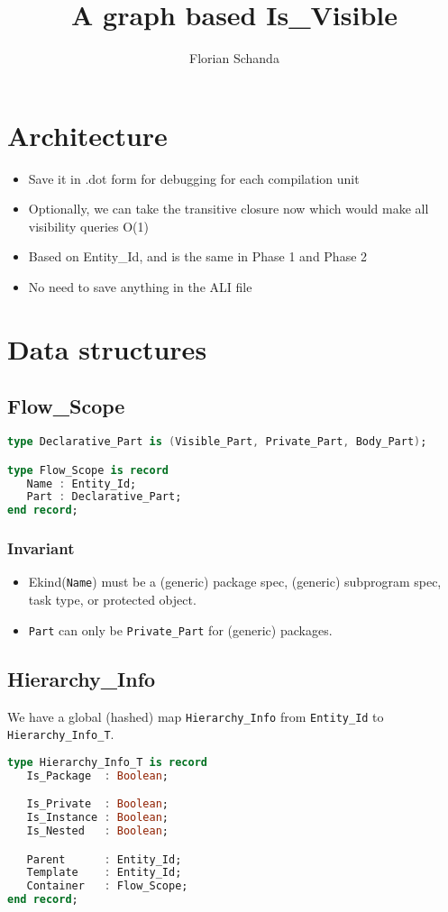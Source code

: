 \documentclass{article}
\title{A graph based Is\_Visible}
\author{Florian Schanda}
\begin{document}
\section{Architecture}
\begin{itemize}
\item Save it in .dot form for debugging for each compilation unit
\item Optionally, we can take the transitive closure now which would make
  all visibility queries O(1)
\item Based on Entity\_Id, and is the same in Phase 1 and Phase 2
\item No need to save anything in the ALI file
\end{itemize}

\section{Data structures}

\subsection{Flow\_Scope}
\begin{lstlisting}[language=Ada]
type Declarative_Part is (Visible_Part, Private_Part, Body_Part);

type Flow_Scope is record
   Name : Entity_Id;
   Part : Declarative_Part;
end record;
\end{lstlisting}

\subsubsection{Invariant}
\begin{itemize}
\item Ekind(\verb|Name|) must be a (generic) package spec, (generic)
  subprogram spec, task type, or protected object.
\item \verb|Part| can only be \verb|Private_Part| for (generic) packages.
\end{itemize}

\subsection{Hierarchy\_Info}
We have a global (hashed) map \verb|Hierarchy_Info| from \verb|Entity_Id|
to \verb|Hierarchy_Info_T|.

\begin{lstlisting}[language=Ada]
type Hierarchy_Info_T is record
   Is_Package  : Boolean;

   Is_Private  : Boolean;
   Is_Instance : Boolean;
   Is_Nested   : Boolean;

   Parent      : Entity_Id;
   Template    : Entity_Id;
   Container   : Flow_Scope;
end record;
\end{lstlisting}
\end{document}
